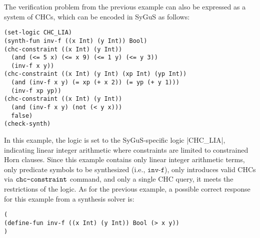 \documentclass[english,a4paper,10pt]{article}
\begin{document}
\begin{example}
The verification problem from the previous example can also be expressed as a system of CHCs,
which can be encoded in SyGuS as follows:
\begin{lstlisting}[language=SyGuS]
(set-logic CHC_LIA)
(synth-fun inv-f ((x Int) (y Int)) Bool)
(chc-constraint ((x Int) (y Int))
  (and (<= 5 x) (<= x 9) (<= 1 y) (<= y 3))
  (inv-f x y))
(chc-constraint ((x Int) (y Int) (xp Int) (yp Int))
  (and (inv-f x y) (= xp (+ x 2)) (= yp (+ y 1)))
  (inv-f xp yp))
(chc-constraint ((x Int) (y Int))
  (and (inv-f x y) (not (< y x)))
  false)
(check-synth)
\end{lstlisting}
In this example, the logic is set to the SyGuS-specific logic
\code|CHC_LIA|, indicating linear integer arithmetic
where constraints are limited to constrained Horn clauses.
Since this example contains only linear integer arithmetic terms,
only predicate symbols to be synthesized (i.e., $\texttt{inv-f}$),
only introduces valid CHCs via $\texttt{chc-constraint}$ command, and
only a single CHC query,
it meets the restrictions of the logic.
As for the previous example, a possible correct response for this example from a synthesis solver is:
\begin{lstlisting}[language=SyGuS]
(
(define-fun inv-f ((x Int) (y Int)) Bool (> x y))
)
\end{lstlisting}
\end{example}
\end{document}
